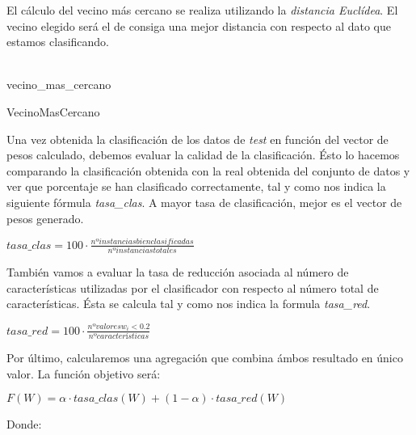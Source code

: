 \documentclass[14pt]{article}
\newcommand\tab[1][1cm]{\hspace*{#1}}
\begin{document}
\tab El cálculo del vecino más cercano se realiza utilizando la \textit{distancia Euclídea}. El vecino elegido será el de consiga una mejor distancia con respecto al dato que estamos clasificando.
~\\

\begin{algorithm}[H]
	\begin{algorithmic}[1]
	\label{lin:lineaRara}
			\EndIf
		\EndIf
	\EndFor ~\\
	\Return vecino\_mas\_cercano
	\end{algorithmic}
	\caption{VecinoMasCercano}
\end{algorithm}

Una vez obtenida la clasificación de los datos de \textit{test} en función del vector de pesos calculado, debemos evaluar la calidad de la clasificación. Ésto lo hacemos comparando la clasificación obtenida con la real obtenida del conjunto de datos y ver que porcentaje se han clasificado correctamente, tal y como nos indica la siguiente fórmula \textit{tasa\_clas}. A mayor tasa de clasificación, mejor es el vector de pesos generado.

\begin{center}
$tasa\_clas = 100 \cdot \frac{nº instancias bien clasificadas}{nº instancias totales} $
\end{center}

También vamos a evaluar la tasa de reducción asociada al número de características utilizadas por el clasificador con respecto al número total de características. Ésta se calcula tal y como nos indica la formula \textit{tasa\_red}.
\begin{center}
$tasa\_red = 100 \cdot \frac{nº valores w_{i} < 0.2}{nº características} $
\end{center}

Por último, calcularemos una agregación que combina ámbos resultado en único valor. La función objetivo será:

\begin{center}
$F(W) = \alpha \cdot tasa\_clas(W) + (1 - \alpha) \cdot tasa\_red(W)$
\end{center}
Donde: 
\end{document}
